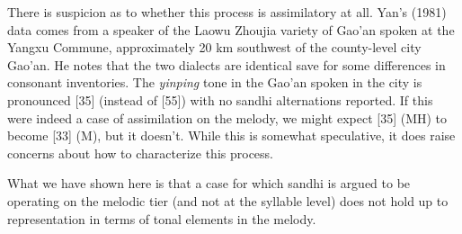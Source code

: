 \documentclass{article}
\begin{document}
There is suspicion as to whether this process is assimilatory at all. Yan's (1981) data comes from a speaker of the Laowu Zhoujia variety of Gao'an spoken at the Yangxu Commune, approximately 20 km southwest of the county-level city Gao'an. He notes that the two dialects are identical save for some differences in consonant inventories. The \textit{yinping} tone in the Gao'an spoken in the city is pronounced [35] (instead of [55]) with no sandhi alternations reported. If this were indeed a case of assimilation on the melody, we might expect [35] (MH) to become [33] (M), but it doesn't. While this is somewhat speculative, it does raise concerns about how to characterize this process.\par  
What we have shown here is that a case for which sandhi is argued to be operating on the melodic tier (and not at the syllable level) does not hold up to representation in terms of tonal elements in the melody.  
\printbibliography
\end{document}

